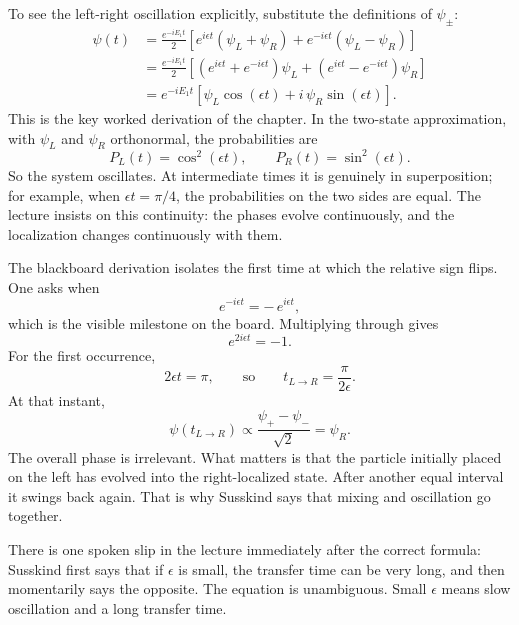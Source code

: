 To see the left-right oscillation explicitly, substitute the definitions of \(\psi_\pm\):
\begin{align}
\psi(t)
&= \frac{e^{-iE_1 t}}{2}
\left[e^{i\epsilon t}(\psi_L+\psi_R)+e^{-i\epsilon t}(\psi_L-\psi_R)\right] \\
&= \frac{e^{-iE_1 t}}{2}
\left[(e^{i\epsilon t}+e^{-i\epsilon t})\psi_L+(e^{i\epsilon t}-e^{-i\epsilon t})\psi_R\right] \\
&= e^{-iE_1 t}\left[\psi_L\cos(\epsilon t)+i\,\psi_R\sin(\epsilon t)\right].
\end{align}
This is the key worked derivation of the chapter. In the two-state approximation, with \(\psi_L\) and \(\psi_R\) orthonormal, the probabilities are
\begin{equation}
P_L(t)=\cos^2(\epsilon t),
\qquad
P_R(t)=\sin^2(\epsilon t).
\end{equation}
So the system oscillates. At intermediate times it is genuinely in superposition; for example, when \(\epsilon t=\pi/4\), the probabilities on the two sides are equal. The lecture insists on this continuity: the phases evolve continuously, and the localization changes continuously with them.

The blackboard derivation isolates the first time at which the relative sign flips. One asks when
\begin{equation}
e^{-i\epsilon t}=-\,e^{i\epsilon t},
\end{equation}
which is the visible milestone on the board. Multiplying through gives
\begin{equation}
e^{2i\epsilon t}=-1.
\end{equation}
For the first occurrence,
\begin{equation}
2\epsilon t=\pi,
\qquad\text{so}\qquad
t_{L\to R}=\frac{\pi}{2\epsilon}.
\end{equation}
At that instant,
\begin{equation}
\psi(t_{L\to R}) \propto \frac{\psi_+-\psi_-}{\sqrt{2}}=\psi_R.
\end{equation}
The overall phase is irrelevant. What matters is that the particle initially placed on the left has evolved into the right-localized state. After another equal interval it swings back again. That is why Susskind says that mixing and oscillation go together.

There is one spoken slip in the lecture immediately after the correct formula: Susskind first says that if \(\epsilon\) is small, the transfer time can be very long, and then momentarily says the opposite. The equation is unambiguous. Small \(\epsilon\) means slow oscillation and a long transfer time.

